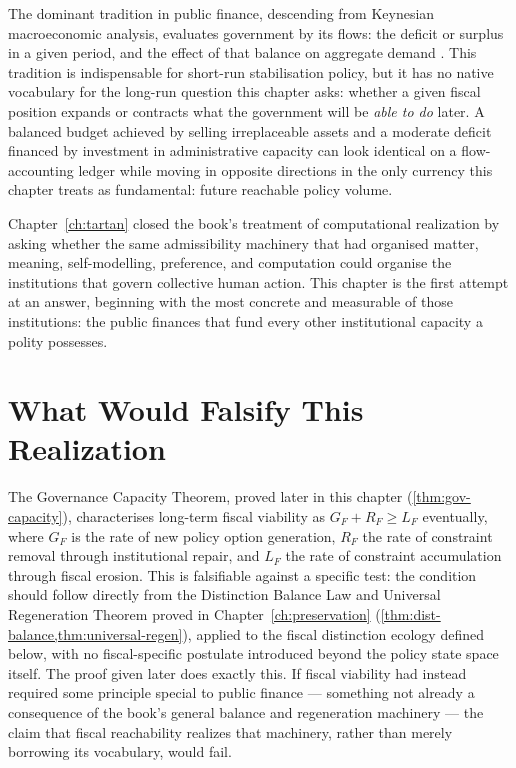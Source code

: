 \documentclass[12pt,twoside,openright]{book}
\begin{document}
The dominant tradition in public finance, descending from
Keynesian macroeconomic analysis, evaluates government by its
flows: the deficit or surplus in a given period, and the
effect of that balance on aggregate demand
\parencite{keynes1936}. This tradition is indispensable for
short-run stabilisation policy, but it has no native vocabulary
for the long-run question this chapter asks: whether a given
fiscal position expands or contracts what the government will
be \emph{able to do} later. A balanced budget achieved by
selling irreplaceable assets and a moderate deficit financed by
investment in administrative capacity can look identical on a
flow-accounting ledger while moving in opposite directions in
the only currency this chapter treats as fundamental: future
reachable policy volume.

Chapter~\ref{ch:tartan} closed the book's treatment of
computational realization by asking whether the same
admissibility machinery that had organised matter, meaning,
self-modelling, preference, and computation could organise the
institutions that govern collective human action. This chapter
is the first attempt at an answer, beginning with the most
concrete and measurable of those institutions: the public
finances that fund every other institutional capacity a polity
possesses.

\section{What Would Falsify This Realization}
\label{sec:ch27-falsifiability}

The Governance Capacity Theorem, proved later in this chapter
(\cref{thm:gov-capacity}), characterises long-term fiscal
viability as $G_F + R_F \ge L_F$ eventually, where $G_F$ is
the rate of new policy option generation, $R_F$ the rate of
constraint removal through institutional repair, and $L_F$ the
rate of constraint accumulation through fiscal erosion. This
is falsifiable against a specific test: the condition should
follow directly from the Distinction Balance Law and Universal
Regeneration Theorem proved in
Chapter~\ref{ch:preservation} (\cref{thm:dist-balance,thm:universal-regen}),
applied to the fiscal distinction ecology defined below, with
no fiscal-specific postulate introduced beyond the policy
state space itself. The proof given later does exactly this.
If fiscal viability had instead required some principle
special to public finance --- something not already a
consequence of the book's general balance and regeneration
machinery --- the claim that fiscal reachability realizes that
machinery, rather than merely borrowing its vocabulary, would
fail.
\end{document}
